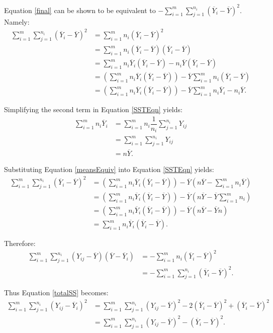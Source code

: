 \documentclass[12pt,a4paper,openright]{article}
\newcommand{\eqn}[1]{Equation \ref{#1}}
\newcommand{\ovY}{\overline{Y}}
\begin{document}
	\eqn{final} can be shown to be equivalent to $\displaystyle -\sum_{i=1}^m \sum_{j=1}^{n_i} (\ovY_i-\ovY)^2$. Namely:
	\begin{align}
		\sum_{i=1}^m \sum_{j=1}^{n_i} (\ovY_i-\ovY)^2 &= \sum_{i=1}^m n_i (\ovY_i-\ovY)^2 \nonumber \\
		&= \sum_{i=1}^m n_i (\ovY_i - \ovY)(\ovY_i - \ovY) \nonumber \\
		&= \sum_{i=1}^m n_i \ovY_i (\ovY_i - \ovY) - n_i\ovY(\ovY_i - \ovY) \nonumber \\
		&= \left(\sum_{i=1}^m n_i \ovY_i (\ovY_i - \ovY)\right) - \ovY \sum_{i=1}^mn_i (\ovY_i-\ovY) \nonumber\\
		&= \left(\sum_{i=1}^m n_i \ovY_i (\ovY_i - \ovY)\right) - \ovY \sum_{i=1}^mn_i \ovY_i - n_i\ovY. \label{SSTEqn}
	\end{align}

	Simplifying the second term in \eqn{SSTEqn} yields:
	\begin{align}
		\sum_{i=1}^m n_i \ovY_i &= \sum_{i=1}^m n_i \dfrac{1}{n_i} \sum_{j=1}^{n_i} Y_{ij} \nonumber \\
		&= \sum_{i=1}^m \sum_{j=1}^{n_i} Y_{ij} \nonumber \\
		&= n\ovY. \label{meansEquiv}
	\end{align}

	Substituting \eqn{meansEquiv} into \eqn{SSTEqn} yields:
	\begin{align*}
		\sum_{i=1}^m \sum_{j=1}^{n_i} (\ovY_i-\ovY)^2 &= \left(\sum_{i=1}^m n_i \ovY_i (\ovY_i - \ovY)\right) - \ovY (n\ovY -\sum_{i=1}^m n_i\ovY) \\
		&= \left(\sum_{i=1}^m n_i \ovY_i (\ovY_i - \ovY)\right) - \ovY (n\ovY - \ovY \sum_{i=1}^m n_i) \\
		&= \left(\sum_{i=1}^m n_i \ovY_i (\ovY_i - \ovY)\right) - \ovY (n\ovY - \ovY n) \\
		&= \sum_{i=1}^m n_i \ovY_i (\ovY_i - \ovY).
	\end{align*}
	
	Therefore:
	\begin{align*}
		\sum_{i=1}^m \sum_{j=1}^{n_i} (Y_{ij}-\ovY)(\ovY - \ovY_i) &= -\sum_{i=1}^m n_i (\ovY_i-\ovY)^2 \\
		&= -\sum_{i=1}^m \sum_{j=1}^{n_i} (\ovY_i-\ovY)^2.
	\end{align*}

	Thus \eqn{totalSS} becomes:
	\begin{align*}
		\sum_{i=1}^m \sum_{j=1}^{n_i} (Y_{ij}-\ovY_i)^2 &= \sum_{i=1}^m \sum_{j=1}^{n_i} (Y_{ij}-\ovY)^2 - 2(\ovY_i-\ovY)^2 + (\ovY_i-\ovY)^2 \\
		&= \sum_{i=1}^m \sum_{j=1}^{n_i} (Y_{ij}-\ovY)^2 - (\ovY_i-\ovY)^2.
	\end{align*}
\end{document}
